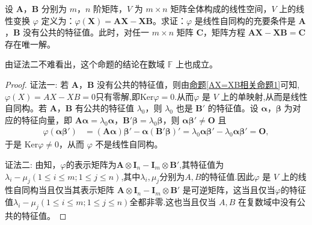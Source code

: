 \documentclass[../../main.tex]{subfiles}%
\begin{document}
\begin{proposition}\label{proposition:AX-XB相关命题1}
设 \(\boldsymbol{A}\)，\(\boldsymbol{B}\) 分别为 \(m\)，\(n\) 阶矩阵，\(V\) 为 \(m\times n\) 矩阵全体构成的线性空间，\(V\) 上的线性变换 \(\varphi\) 定义为：\(\varphi(\boldsymbol{X}) = \boldsymbol{AX - XB}\)。求证：\(\varphi\) 是线性自同构的充要条件是 \(\boldsymbol{A}\)，\(\boldsymbol{B}\) 没有公共的特征值。此时，对任一 \(m\times n\) 矩阵 \(\boldsymbol{C}\)，矩阵方程 \(\boldsymbol{AX - XB = C}\) 存在唯一解。
\end{proposition}
\begin{remark}
由{\color{blue}证法二}不难看出，这个命题的结论在数域 $\mathbb{F}$ 上也成立。
\end{remark}
\begin{proof}

{\color{blue}证法一:}
若 \(\boldsymbol{A}\)，\(\boldsymbol{B}\) 没有公共的特征值，则由\hyperref[AX=XB相关命题1]{命题\ref{AX=XB相关命题1}}可知,$\varphi(X)=AX-XB=0$只有零解,即$\mathrm{Ker}\varphi= 0$.从而\(\varphi\) 是 \(V\) 上的单映射,从而是线性自同构。若 \(\boldsymbol{A}\)，\(\boldsymbol{B}\) 有公共的特征值 \(\lambda_0\)，则 \(\lambda_0\) 也是 \(\boldsymbol{B}'\) 的特征值。设 \(\boldsymbol{\alpha}\)，\(\boldsymbol{\beta}\) 为对应的特征向量，即 \(\boldsymbol{A\alpha}=\lambda_0\boldsymbol{\alpha}\)，\(\boldsymbol{B}'\boldsymbol{\beta}=\lambda_0\boldsymbol{\beta}\)，则 \(\boldsymbol{\alpha\beta}'\neq\boldsymbol{O}\) 且
\begin{align*}
\varphi(\boldsymbol{\alpha\beta}')&=(\boldsymbol{A\alpha})\boldsymbol{\beta}' - \boldsymbol{\alpha}(\boldsymbol{B}'\boldsymbol{\beta})'=\lambda_0\boldsymbol{\alpha\beta}' - \lambda_0\boldsymbol{\alpha\beta}'=\boldsymbol{O},
\end{align*}
于是 \(\mathrm{Ker}\varphi\neq 0\)，从而 \(\varphi\) 不是线性自同构。

{\color{blue}证法二:}
由知，$\varphi$的表示矩阵为$\boldsymbol{A} \otimes \boldsymbol{I}_n - \boldsymbol{I}_m \otimes \boldsymbol{B}'$,其特征值为$\lambda_i - \mu_j (1 \leqslant  i \leqslant  m; 1 \leqslant  j \leqslant  n)$,其中$\lambda_i,\mu_j$分别为$A,B$的特征值.因此$\varphi$ 是 $V$ 上的线性自同构当且仅当其表示矩阵 $\boldsymbol{A} \otimes \boldsymbol{I}_n - \boldsymbol{I}_m \otimes \boldsymbol{B}'$ 是可逆矩阵，这当且仅当$\varphi$的特征值$\lambda_i - \mu_j (1 \leqslant  i \leqslant  m; 1 \leqslant  j \leqslant  n)$全都非零.这也当且仅当 $A,B$ 在复数域中没有公共的特征值。
\end{proof}
\end{document}
